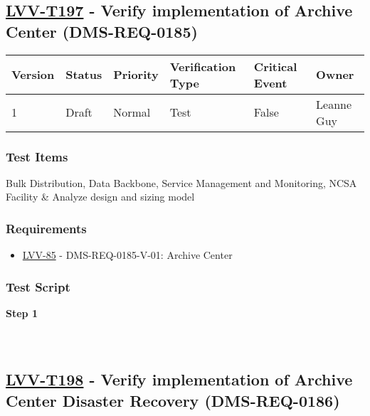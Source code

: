 \hypertarget{lvv-t197---verify-implementation-of-archive-center-dms-req-0185}{%
\subsection{\texorpdfstring{\href{https://jira.lsstcorp.org/secure/Tests.jspa\#/testCase/LVV-T197}{LVV-T197}
- Verify implementation of Archive Center
(DMS-REQ-0185)}{LVV-T197 - Verify implementation of Archive Center (DMS-REQ-0185)}}\label{lvv-t197---verify-implementation-of-archive-center-dms-req-0185}}

\begin{longtable}[]{@{}llllll@{}}
\toprule
Version & Status & Priority & Verification Type & Critical Event &
Owner\tabularnewline
\midrule
\endhead
1 & Draft & Normal & Test & False & Leanne Guy\tabularnewline
\bottomrule
\end{longtable}

\hypertarget{test-items-97}{%
\subsubsection{Test Items}\label{test-items-97}}

Bulk Distribution, Data Backbone, Service Management and Monitoring,
NCSA Facility \& Analyze design and sizing model

\hypertarget{requirements-97}{%
\subsubsection{Requirements}\label{requirements-97}}

\begin{itemize}
\tightlist
\item
  \href{https://jira.lsstcorp.org/browse/LVV-85}{LVV-85} -
  DMS-REQ-0185-V-01: Archive Center
\end{itemize}

\hypertarget{test-script-97}{%
\subsubsection{Test Script}\label{test-script-97}}

\textbf{Step 1}\\
~\\
~\\

\hypertarget{lvv-t198---verify-implementation-of-archive-center-disaster-recovery-dms-req-0186}{%
\subsection{\texorpdfstring{\href{https://jira.lsstcorp.org/secure/Tests.jspa\#/testCase/LVV-T198}{LVV-T198}
- Verify implementation of Archive Center Disaster Recovery
(DMS-REQ-0186)}{LVV-T198 - Verify implementation of Archive Center Disaster Recovery (DMS-REQ-0186)}}\label{lvv-t198---verify-implementation-of-archive-center-disaster-recovery-dms-req-0186}}

